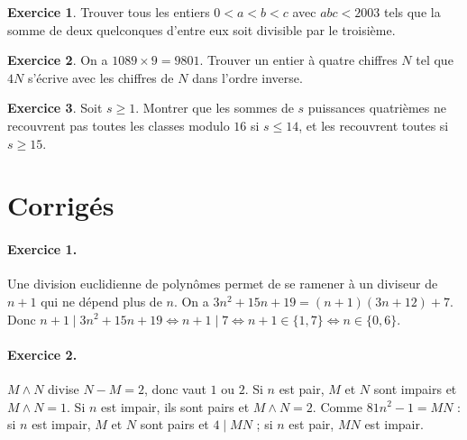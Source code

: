 \documentclass[11pt,a4paper]{article}
\theoremstyle{plain}
\theoremstyle{definition}
\newtheorem{exercice}{Exercice}
\theoremstyle{remark}
\newcommand{\pgcd}{\wedge}
\begin{document}
\begin{exercice}
Trouver tous les entiers $0<a<b<c$ avec $abc<2003$ tels que la somme de deux quelconques d'entre eux soit divisible par le troisième.
\end{exercice}

\begin{exercice}
On a $1089\times9=9801$. Trouver un entier à quatre chiffres $N$ tel que $4N$ s'écrive avec les chiffres de $N$ dans l'ordre inverse.
\end{exercice}

\begin{exercice}
Soit $s\geq1$. Montrer que les sommes de $s$ puissances quatrièmes ne recouvrent pas toutes les classes modulo $16$ si $s\leq14$, et les recouvrent toutes si $s\geq15$.
\end{exercice}

\section{Corrigés}

\paragraph{Exercice 1.} Une division euclidienne de polynômes permet de se ramener à un diviseur de $n+1$ qui ne dépend plus de $n$. On a $3n^2+15n+19=(n+1)(3n+12)+7$. Donc $n+1\mid3n^2+15n+19\iff n+1\mid7\iff n+1\in\{1,7\}\iff n\in\{0,6\}$.

\paragraph{Exercice 2.} $M\pgcd N$ divise $N-M=2$, donc vaut $1$ ou $2$. Si $n$ est pair, $M$ et $N$ sont impairs et $M\pgcd N=1$. Si $n$ est impair, ils sont pairs et $M\pgcd N=2$. Comme $81n^2-1=MN$ : si $n$ est impair, $M$ et $N$ sont pairs et $4\mid MN$ ; si $n$ est pair, $MN$ est impair.
\end{document}
